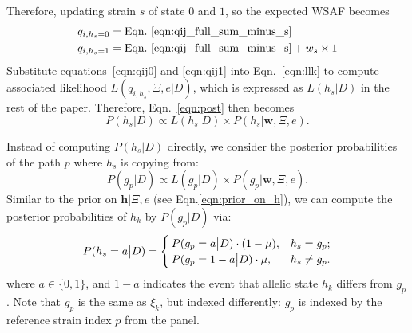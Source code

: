 \documentclass{bioinfo}
\begin{document}
Therefore, updating strain $s$ of state $0$ and $1$, so the expected WSAF becomes
\begin{align}
q_{i,h_s=0} & = \textrm{Eqn.~\eqref{eqn:qij_full_sum_minus_s}} \label{eqn:qij0}\\
q_{i,h_s=1} & = \textrm{Eqn.~\eqref{eqn:qij_full_sum_minus_s}} + w_s \times 1 \label{eqn:qij1}
\end{align}
Substitute equations~\eqref{eqn:qij0} and \eqref{eqn:qij1} into Eqn.~\eqref{eqn:llk} to compute associated likelihood $L(q_{i,h_s}, \Xi, e |D)$, which is expressed as $L(h_s |D)$ in the rest of the paper. Therefore, Eqn.~\eqref{eqn:post} then becomes
\begin{equation}
P(h_s |D) \propto  L(h_s |D) \times P(h_s|\mathbf{w}, \Xi, e).
\end{equation}

Instead of computing $P(h_s |D)$ directly, we consider the posterior probabilities of the path $p$ where $h_s$ is copying from:
\begin{equation}
P(g_p |D) \propto  L(g_p |D) \times P(g_p|\mathbf{w}, \Xi, e).\label{eqn:post_gp}
\end{equation}
Similar to the prior on $\mathbf{h}| \Xi, e$ (see Eqn.\eqref{eqn:prior_on_h}), we can compute the posterior probabilities of $h_k$ by $P(g_p |D)$ via:
\begin{equation}
P(h_{s} = a \big{|} D) =
\begin{cases}
P(g_{p} = a \big{|} D) \cdot (1-\mu), & h_s = g_p;\\
P(g_{p} = 1 - a \big{|} D) \cdot \mu, & h_s \neq g_p.
\end{cases}
\label{eqn:ps0}
\end{equation}
where $a \in \{0, 1\}$, and $1-a$ indicates the event that allelic state $h_k$ differs from $g_p$. Note that $g_p$ is the same as $\xi_k$, but indexed differently: $g_p$ is indexed by the reference strain index $p$ from the panel.
\end{document}
